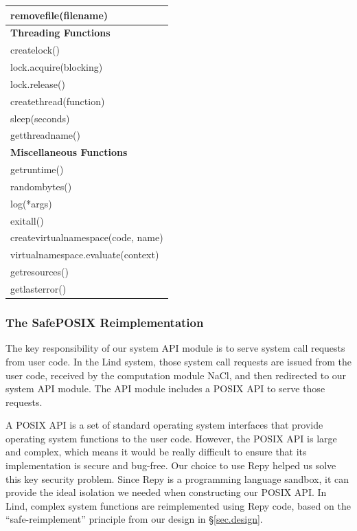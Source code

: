 \begin{table}
\begin{tabular}{|l|}
  \hline
  removefile(filename) \\
  \hline \hline
  \textbf{Threading Functions} \\
  \hline
  createlock() \\
  \hline
  lock.acquire(blocking) \\
  \hline
  lock.release() \\
  \hline
  createthread(function) \\
  \hline
  sleep(seconds) \\
  \hline
  getthreadname() \\
  \hline \hline
  \textbf{Miscellaneous Functions} \\
  \hline
  getruntime() \\
  \hline
  randombytes() \\
  \hline
  log(*args) \\
  \hline
  exitall() \\
  \hline
  createvirtualnamespace(code, name) \\
  \hline
  virtualnamespace.evaluate(context) \\
  \hline
  getresources() \\
  \hline
  getlasterror() \\
  \hline
\end{tabular}
\label{table:RepyKernel}
\end{table}

\subsubsection{The SafePOSIX Reimplementation}

The key responsibility of our system API module is to serve system call requests from user code. 
In the Lind system, those system call requests are issued from the user code, 
received by the computation module NaCl, and then redirected to our system API module. 
The API module includes a POSIX API to serve those requests. 

A POSIX API is a set of standard operating system interfaces that provide operating system functions 
to the user code. However, the POSIX API is large and complex, which means 
it would be really difficult to ensure that its implementation is secure and bug-free. 
Our choice to use Repy helped us solve this key security problem. 
Since Repy is a programming language sandbox, it can provide the ideal isolation 
we needed when constructing our POSIX API. In Lind, 
complex system functions are reimplemented using Repy code, 
based on the ``safe-reimplement'' principle from our design in \S{\ref{sec.design}}.

